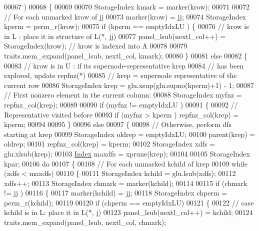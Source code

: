 \begin{DoxyCode}
00067                   )
00068 \{
00069   
00070   StorageIndex kmark = marker(krow);
00071       
00072   \textcolor{comment}{// For each unmarked krow of jj}
00073   marker(krow) = jj; 
00074   StorageIndex kperm = perm\_r(krow); 
00075   \textcolor{keywordflow}{if} (kperm == emptyIdxLU ) \{
00076     \textcolor{comment}{// krow is in L : place it in structure of L(*, jj)}
00077     panel\_lsub(nextl\_col++) = StorageIndex(krow);  \textcolor{comment}{// krow is indexed into A}
00078     
00079     traits.mem\_expand(panel\_lsub, nextl\_col, kmark);
00080   \}
00081   \textcolor{keywordflow}{else} 
00082   \{
00083     \textcolor{comment}{// krow is in U : if its supernode-representative krep}
00084     \textcolor{comment}{// has been explored, update repfnz(*)}
00085     \textcolor{comment}{// krep = supernode representative of the current row}
00086     StorageIndex krep = glu.xsup(glu.supno(kperm)+1) - 1; 
00087     \textcolor{comment}{// First nonzero element in the current column:}
00088     StorageIndex myfnz = repfnz\_col(krep); 
00089     
00090     \textcolor{keywordflow}{if} (myfnz != emptyIdxLU )
00091     \{
00092       \textcolor{comment}{// Representative visited before}
00093       \textcolor{keywordflow}{if} (myfnz > kperm ) repfnz\_col(krep) = kperm; 
00094       
00095     \}
00096     \textcolor{keywordflow}{else} 
00097     \{
00098       \textcolor{comment}{// Otherwise, perform dfs starting at krep}
00099       StorageIndex oldrep = emptyIdxLU; 
00100       parent(krep) = oldrep; 
00101       repfnz\_col(krep) = kperm; 
00102       StorageIndex xdfs =  glu.xlsub(krep); 
00103       \hyperlink{namespace_eigen_a62e77e0933482dafde8fe197d9a2cfde}{Index} maxdfs = xprune(krep); 
00104       
00105       StorageIndex kpar;
00106       \textcolor{keywordflow}{do} 
00107       \{
00108         \textcolor{comment}{// For each unmarked kchild of krep}
00109         \textcolor{keywordflow}{while} (xdfs < maxdfs) 
00110         \{
00111           StorageIndex kchild = glu.lsub(xdfs); 
00112           xdfs++; 
00113           StorageIndex chmark = marker(kchild); 
00114           
00115           \textcolor{keywordflow}{if} (chmark != jj ) 
00116           \{
00117             marker(kchild) = jj; 
00118             StorageIndex chperm = perm\_r(kchild); 
00119             
00120             \textcolor{keywordflow}{if} (chperm == emptyIdxLU) 
00121             \{
00122               \textcolor{comment}{// case kchild is in L: place it in L(*, j)}
00123               panel\_lsub(nextl\_col++) = kchild;
00124               traits.mem\_expand(panel\_lsub, nextl\_col, chmark);

\end{DoxyCode}
